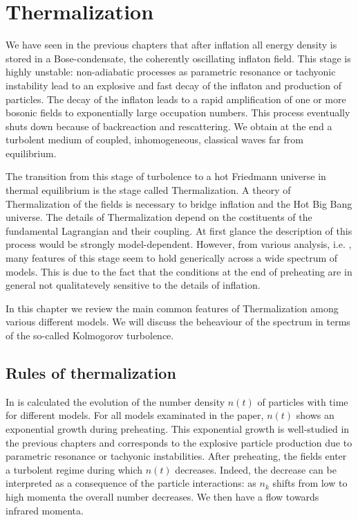 \documentclass[11pt,a4paper,twoside]{book}
\begin{document}
\chapter{Thermalization}
We have seen in the previous chapters that after inflation all energy density is stored in a Bose-condensate, the coherently oscillating inflaton field. This stage is highly unstable: non-adiabatic processes as parametric resonance or tachyonic instability lead to an explosive and fast  decay of the inflaton and production of particles. The decay of the inflaton leads to a rapid amplification of one or more bosonic fields to exponentially large occupation numbers. This process eventually shuts down because of backreaction and rescattering. We obtain  at the end a turbolent medium of coupled, inhomogeneous, classical waves far from equilibrium.

The transition from this stage of turbolence to a hot Friedmann universe in thermal equilibrium is the stage called Thermalization. A theory of Thermalization of the fields is necessary to bridge inflation and the Hot Big Bang universe. The details of  Thermalization depend on the costituents of the fundamental Lagrangian and their coupling. At first glance the description of this process would be strongly model-dependent. However, from various analysis, i.e. \cite{Chap6:DevelopmentEquilibrium}, many features of this stage seem to hold generically across a wide spectrum of models. This is due to the fact that the conditions at the end of preheating are in general not qualitatevely sensitive to the details of inflation.

In this chapter we review the main common features of Thermalization among various different models. We will discuss the beheaviour of the spectrum in terms of the so-called Kolmogorov turbolence.

\section{Rules of thermalization}
In \cite{Chap6:DevelopmentEquilibrium} is calculated the evolution of  the number density $ n(t) $ of particles with time for different models. For all models examinated in the paper,  $ n(t) $  shows an exponential growth during preheating. This exponential growth is well-studied in the previous chapters and corresponds to the explosive particle production due to parametric resonance or tachyonic instabilities. After preheating, the fields enter a turbolent regime during which $ n(t) $ decreases. Indeed, the decrease can be interpreted as a consequence of the particle interactions: as $ n_{k} $ shifts from low to high momenta the overall number decreases. We then have a flow towards infrared momenta.
\end{document}

